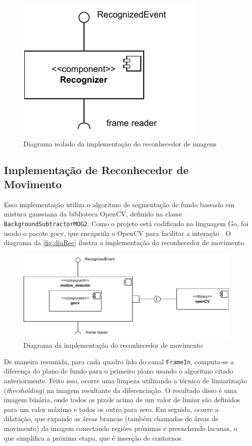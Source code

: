 \documentclass[12pt, %
openright, 
oneside, %
a4paper,    %
brazil]{facom-ufu-abntex2}
\begin{document}
\begin{figure}[!ht]
	\centering
	\includegraphics[width=0.4\linewidth]{recognizer.pdf}
	\caption[Diagrama isolado da implementação do reconhecedor de
		imagens]{Diagrama isolado da implementação do reconhecedor de imagens}
	\label{fig:diaImg}
\end{figure}

\subsection{Implementação de Reconhecedor de Movimento}

Essa implementação utiliza o algoritmo de segmentação de fundo baseado em
mistura gaussiana da biblioteca OpenCV, definido na classe
\texttt{BackgroundSubtractorMOG2}. Como o projeto está codificado na linguagem
Go, foi usado o pacote gocv, que encapsula o OpenCV para facilitar a interação
\cite{gocv_package}. O diagrama da \autoref{fig:diaRec} ilustra a implementação
do reconhecedor de movimento.

\begin{figure}[!ht]
	\centering
	\includegraphics[width=1.0\linewidth]{motion_detector.pdf}
	\caption[Diagrama da implementação do reconhecedor de
		movimento]{Diagrama da implementação do reconhecedor de movimento}
	\label{fig:diaRec}
\end{figure}

De maneira resumida, para cada quadro lido do canal \texttt{FrameIn},
computa-se a diferença do plano de fundo para o primeiro plano usando o
algoritmo citado anteriormente. Feito isso, ocorre uma limpeza utilizando a
técnica de limiarização (\textit{thresholding}) na imagem resultante da
diferenciação. O resultado disso é uma imagem binária, onde todos os pixels
acima de um valor de limiar são definidos para um valor máximo e todos os outro
para zero. Em seguida, ocorre a dilatação, que expande as áreas brancas (também
chamadas de áreas de movimento) da imagem conectando regiões próximas e
preenchendo lacunas, o que simplifica a próxima etapa, que é inserção de
contornos.
\end{document}
